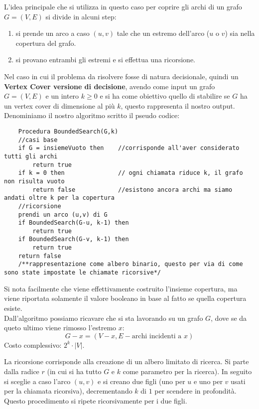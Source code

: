 L'idea principale che si utilizza in questo caso per coprire gli archi di un grafo $G=(V,E)$ si divide in alcuni step:
\begin{enumerate}
    \item si prende un arco a caso $(u,v)$ tale che un estremo dell’arco ($u$ o $v$) sia nella copertura del grafo.
    \item si provano entrambi gli estremi e si effettua una ricorsione.\textbf{}
\end{enumerate}
Nel caso in cui il problema da risolvere fosse di natura decisionale, quindi un \textbf{Vertex Cover versione di decisione}, avendo come input un grafo $G=(V,E)$ e un intero $k \geq 0$ e si ha come obiettivo quello di stabilire se $G$ ha un vertex cover di dimensione al più $k$, questo rappresenta il nostro output. 
Denominiamo il nostro algoritmo scritto il pseudo codice:
\begin{lstlisting}
    Procedura BoundedSearch(G,k)
    //casi base
    if G = insiemeVuoto then    //corrisponde all'aver considerato tutti gli archi
    	return true
    if k = 0 then               // ogni chiamata riduce k, il grafo non risulta vuoto
    	return false            //esistono ancora archi ma siamo andati oltre k per la copertura
    //ricorsione
    prendi un arco (u,v) di G
    if BoundedSearch(G-u, k-1) then 
    	return true
    if BoundedSearch(G-v, k-1) then
    	return true
    return false 
    /**rappresentazione come albero binario, questo per via di come sono state impostate le chiamate ricorsive*/
\end{lstlisting}
Si nota facilmente che viene effettivamente costruito l'insieme copertura, ma viene riportata solamente il valore booleano in base al fatto se quella copertura esiste.\\
Dall'algoritmo possiamo ricavare che si sta lavorando su un grafo $G$, dove se da queto ultimo viene rimosso  l’estremo $x$: \[G-x = (V-x, E - {\text{archi incidenti a } x})\]
Costo complessivo: $2^k \cdot |V|$.

La ricorsione corrisponde alla creazione di un albero limitato di ricerca. Si parte dalla radice $r$ (in cui si ha tutto $G$ e $k$ come parametro per la ricerca). In seguito si sceglie a caso l’arco $(u,v)$ e si creano due figli (uno per $u$ e uno per $v$ usati per la chiamata ricorsiva), decrementando $k$ di $1$ per scendere in profondità. Questo procedimento si ripete ricorsivamente per i due figli. \\

